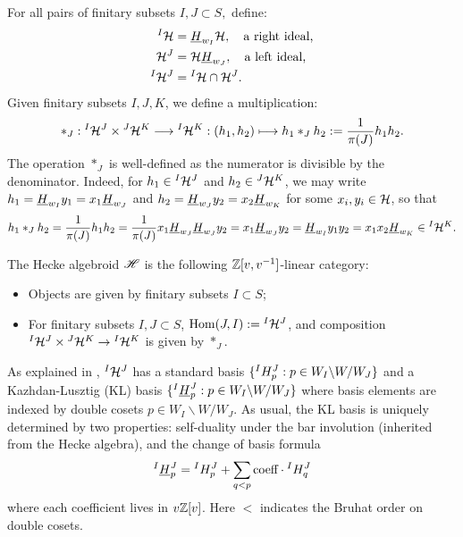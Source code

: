 For all pairs of finitary subsets $I,J \subset S,$ define:
\begin{align*}
    {}^I\mathcal{H} &= \underline{H}_{w_I}\mathcal{H}, \quad \text{a right ideal,}\\
    \mathcal{H}^J &= \mathcal{H}\underline{H}_{w_J}, \quad \text{a left ideal,}\\
    {^I}\mathcal{H}^{J} &= {}^I\mathcal{H}\cap\mathcal{H}^J.
\end{align*}
Given finitary subsets $I, J, K$, we define a multiplication:
\begin{align*}
    \ast_J :{}^I\mathcal{H}^J\times {}^J\mathcal{H}^K \longrightarrow {}^I\mathcal{H}^K:
    (h_1,h_2) \longmapsto h_1 \ast_J h_2 := \frac{1}{\pi(J)}h_1h_2.
\end{align*}
The operation $\ast_J$ is well-defined as the numerator is divisible by the denominator.
Indeed, for $h_1 \in {}^{I}\mathcal{H}^{J}$ and $h_2 \in {}^{J}\mathcal{H}^{K}$, we may write $h_1=\underline{H}_{w_I}y_1=x_1\underline{H}_{w_J}$ and $h_2=\underline{H}_{w_J} y_2=x_2\underline{H}_{w_K}$ for some $x_i, y_i \in \mathcal{H}$, so that 
$$h_1\ast_J h_2=\frac{1}{\pi(J)}h_1h_2=\frac{1}{\pi(J)} x_1\underline{H}_{w_J}\underline{H}_{w_J}y_2=x_1\underline{H}_{w_J}y_2=\underline{H}_{w_I}y_1y_2=x_1x_2\underline{H}_{w_K} \in {}^{I}\mathcal{H}^{K}.$$

\begin{defn}\cite[Definition 2.3.1]{WillSingular}
    The Hecke algebroid $\mathscr{H}$ is the following $\mathbb{Z}[v,v^{-1}]$-linear category:
    \begin{itemize}
        \item Objects are given by finitary subsets $I \subset S$;
        \item For finitary subsets $I, J \subset S$, $\operatorname{Hom}(J,I):={}^I\mathcal{H}^J$, and composition ${}^I\mathcal{H}^J\times {}^J\mathcal{H}^K \rightarrow {}^I\mathcal{H}^K$ is given by $\ast_J$.
    \end{itemize}
\end{defn}
As explained in \cite[section 2.3]{WillSingular}, ${}^{I}\mathcal{H}^{J}$ has a standard basis $\{{}^{I}H^{J}_{p}: p\in W_I\backslash W/W_J\}$ and a Kazhdan-Lusztig (KL) basis $\{{}^{I}\underline{H}^{J}_{p}:p \in W_I\backslash W/W_J \}$ where basis elements are indexed by double cosets $p \in W_I\backslash W/ W_J$. As usual, the KL basis is uniquely determined by two properties: self-duality under the bar involution (inherited from the Hecke algebra), and the change of basis formula
\begin{equation} {}^{I}\underline{H}^{J}_{p} = {}^{I}H^{J}_{p} + \sum_{q < p} \textrm{coeff} \cdot {}^{I}H^{J}_{q} \end{equation}
where each coefficient lives in $v \mathbb{Z}[v]$. Here $<$ indicates the Bruhat order on double cosets.

